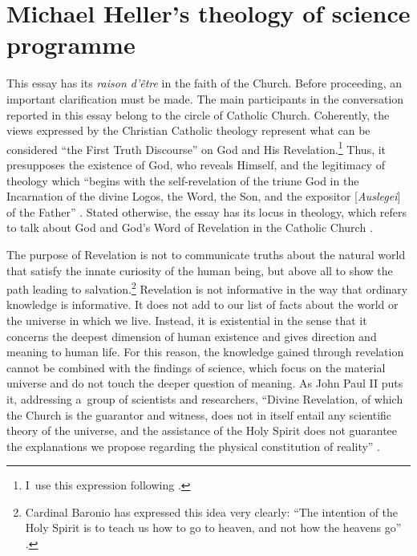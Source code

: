 \section{Michael Heller's theology of science programme}

This essay has its \textit{raison d'être} in the faith of the Church. Before proceeding, an important clarification must be made. The main participants in the conversation reported in this essay belong to the circle of Catholic Church. Coherently, the views expressed by the Christian Catholic theology represent what can be considered ``the First Truth Discourse'' on God and His Revelation.\footnote{I~use this expression following 
\parencite[][pp.26–39]{tyson_christian_2022}. %
 } Thus, it presupposes the existence of God, who reveals Himself, and the legitimacy of theology which ``begins with the self-revelation of the triune God in the Incarnation of the divine Logos, the Word, the Son, and the expositor [\textit{Auslegei}] of the Father'' 
\parencite[][p.11]{balthasar_theo-logic_2004}. %
 Stated otherwise, the essay has its locus in theology, which refers to talk about God and God's Word of Revelation in the Catholic Church 
\parencite[an expressioof][p.2]{barth_church_2010}.%




The purpose of Revelation is not to communicate truths about the natural world that satisfy the innate curiosity of the human being, but above all to show the path leading to salvation.\footnote{Cardinal Baronio has expressed this idea very clearly: ``The intention of the Holy Spirit is to teach us how to go to heaven, and not how the heavens go'' 
\parencite[][p.185]{mcmullin_augustine_1999}. %
 } Revelation is not informative in the way that ordinary knowledge is informative. It does not add to our list of facts about the world or the universe in which we live. Instead, it is existential in the sense that it concerns the deepest dimension of human existence and gives direction and meaning to human life. For this reason, the knowledge gained through revelation cannot be combined with the findings of science, which focus on the material universe and do not touch the deeper question of meaning. As John Paul II puts it, addressing a~group of scientists and researchers, ``Divine Revelation, of which the Church is the guarantor and witness, does not in itself entail any scientific theory of the universe, and the assistance of the Holy Spirit does not guarantee the explanations we propose regarding the physical constitution of reality'' 
\parencite[][]{}.%




